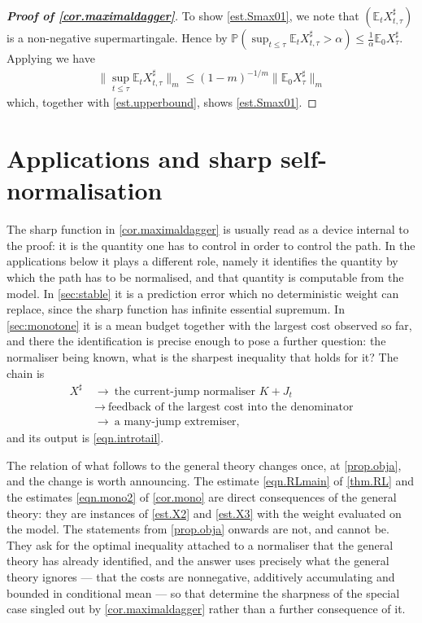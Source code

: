 \documentclass[12pt,oneside,reqno,fleqn]{amsart}
\numberwithin{equation}{section}
\theoremstyle{remark}
\newcommand\mE{{\mathbb E}}
\newcommand\E{\mE}
\newcommand\PP{{\mathbb P}}
\newcommand{\1}{{\mathbf 1}}
\renewcommand{\le}{\leq}
\begin{document}
\begin{proof}[\bf Proof of \cref{cor.maximaldagger}]
		To show \eqref{est.Smax01}, we note that $(\E_tX^{\sharp}_{t,\tau})$ is a non-negative supermartingale. Hence by \cite[Chapter II (1.15)]{MR1725357} $\PP(\sup_{t\le \tau}\E_tX^\sharp_{t,\tau}>\alpha)\le \frac1 \alpha\E_0X^\sharp_{\tau}$. Applying \cite[Lemma 2.22]{kuhn2022maximal} we have
		\begin{align*}
			\|\sup_{t\le \tau}\E_tX^\sharp_{t,\tau}\|_m\le (1-m)^{-1/m}\|\E_0X^{\sharp}_\tau\|_m
		\end{align*}
		which, together with \eqref{est.upperbound}, shows \eqref{est.Smax01}.
	\end{proof}

	
	
\section{Applications and sharp self-normalisation} %
\label{sec:applications}

	The sharp function in \cref{cor.maximaldagger} is usually read as a device internal to the proof: it is the quantity one has to control in order to control the path. In the applications below it plays a different role, namely it identifies the quantity by which the path has to be normalised, and that quantity is computable from the model. In \cref{sec:stable} it is a prediction error which no deterministic weight can replace, since the sharp function has infinite essential supremum. In \cref{sec:monotone} it is a mean budget together with the largest cost observed so far, and there the identification is precise enough to pose a further question: the normaliser being known, what is the sharpest inequality that holds for it? The chain is
	\[
	\begin{aligned}
	X^\sharp\ &\longrightarrow\ \text{the current-jump normaliser }K+J_t\\
	&\longrightarrow\ \text{feedback of the largest cost into the denominator}\\
	&\longrightarrow\ \text{a many-jump extremiser},
	\end{aligned}
	\]
	and its output is \eqref{eqn.introtail}.

	The relation of what follows to the general theory changes once, at \cref{prop.obja}, and the change is worth announcing. The estimate \eqref{eqn.RLmain} of \cref{thm.RL} and the estimates \eqref{eqn.mono2} of \cref{cor.mono} are direct consequences of the general theory: they are instances of \eqref{est.X2} and \eqref{est.X3} with the weight evaluated on the model. The statements from \cref{prop.obja} onwards are not, and cannot be. They ask for the optimal inequality attached to a normaliser that the general theory has already identified, and the answer uses precisely what the general theory ignores --- that the costs are nonnegative, additively accumulating and bounded in conditional mean --- so that  determine the sharpness of the special case singled out by \cref{cor.maximaldagger} rather than a further consequence of it.
\end{document}
